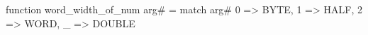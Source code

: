 function word_width_of_num arg# = match arg# {
  0 => BYTE,
  1 => HALF,
  2 => WORD,
  _ => DOUBLE
}
